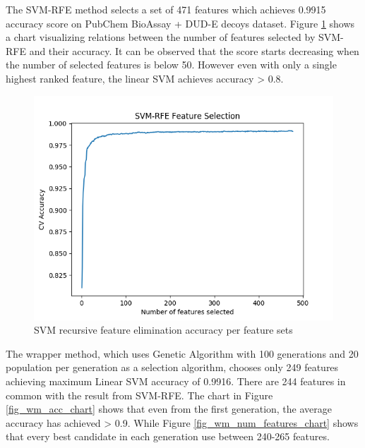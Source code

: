 \documentclass[conference,compsoc,12pt]{IEEEtran}
\begin{document}
	The SVM-RFE method selects a set of 471 features which achieves 0.9915 accuracy score on PubChem BioAssay + DUD-E decoys dataset. Figure \ref{fig_svmrfe_acc_num_features_chart} shows a chart visualizing relations between the number of features selected by SVM-RFE and their accuracy. It can be observed that the score starts decreasing when the number of selected features is below 50. However even with only a single highest ranked feature, the linear SVM achieves accuracy > 0.8.
		
	\begin{figure}
		\includegraphics[scale=0.5]{../images/SVM_RFE_chart.png}
		\caption{SVM recursive feature elimination accuracy per feature sets}
		\label{fig_svmrfe_acc_num_features_chart}
	\end{figure}
	
	The wrapper method, which uses Genetic Algorithm with 100 generations and 20 population per generation as a selection algorithm, chooses only 249 features achieving maximum Linear SVM accuracy of 0.9916. There are 244 features in common with the result from SVM-RFE. The chart in Figure \ref{fig_wm_acc_chart} shows that even from the first generation, the average accuracy has achieved > 0.9. While Figure \ref{fig_wm_num_features_chart} shows that every best candidate in each generation use between 240-265 features.
		
\end{document}
